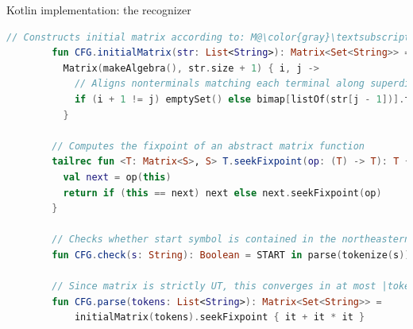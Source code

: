 \documentclass{beamer}
\begin{document}
    \begin{frame}[fragile]{Kotlin implementation: the recognizer}
        \begin{lstlisting}[language=Kotlin, gobble=8, basicstyle=\scriptsize\ttfamily]
        // Constructs initial matrix according to: M@\color{gray}\textsubscript{i+1=j}@ = { A | (A -> @\color{gray}\texttt{σ}\textsubscript{i}@) @\color{gray}\texttt{∈}@ P }
        fun CFG.initialMatrix(str: List<String>): Matrix<Set<String>> =
          Matrix(makeAlgebra(), str.size + 1) { i, j ->
            // Aligns nonterminals matching each terminal along superdiagonal
            if (i + 1 != j) emptySet() else bimap[listOf(str[j - 1])].toSet()
          }

        // Computes the fixpoint of an abstract matrix function
        tailrec fun <T: Matrix<S>, S> T.seekFixpoint(op: (T) -> T): T {
          val next = op(this)
          return if (this == next) next else next.seekFixpoint(op)
        }

        // Checks whether start symbol is contained in the northeasternmost entry
        fun CFG.check(s: String): Boolean = START in parse(tokenize(s))[0].last()

        // Since matrix is strictly UT, this converges in at most |tokens| steps
        fun CFG.parse(tokens: List<String>): Matrix<Set<String>> =
            initialMatrix(tokens).seekFixpoint { it + it * it }
        \end{lstlisting}
    \end{frame}
\end{document}

